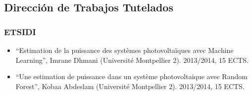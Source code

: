 \documentclass[article, a4paper]{memoir}
\begin{document}
\subsection{Dirección de Trabajos Tutelados}
\label{sec:orgheadline19}
\subsubsection{ETSIDI}
\label{sec:orgheadline16}
\begin{itemize}
\item “Estimation de la puissance des systèmes photovoltaïques avec Machine Learning”, Imrane Dhmani (Université Montpellier 2). 2013/2014, 15 ECTS.
\item “Une estimation de puissance dans un système photovoltaique avec Random Forest”, Kobaa Abdeslam (Université Montpellier 2). 2013/2014, 15 ECTS.
\end{itemize}
\end{document}
